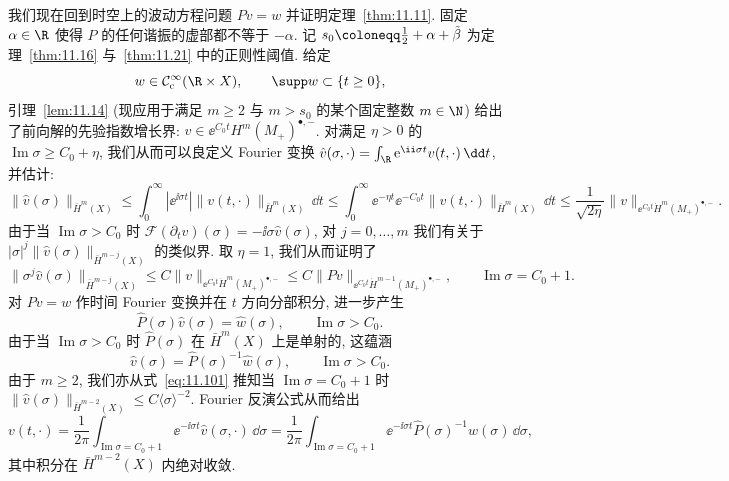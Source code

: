 我们现在回到时空上的波动方程问题 $P v = w$ 并证明定理~\ref{thm:11.11}. 固定 $\alpha \in \R$ 使得 $P$ 的任何谐振的虚部都不等于 $-\alpha$. 记 $s_0 \defeq \frac{1}{2} + \alpha + \tilde\beta$ 为定理~\ref{thm:11.16} 与~\ref{thm:11.21} 中的正则性阈值. 给定
\begin{equation}\label{eq:11.99}
    w \in \mathcal{C}_{\mathrm{c}}^\infty(\R \times X), \qquad \supp w \subset \{t \ge 0\},
\end{equation}
引理~\ref{lem:11.14} (现应用于满足 $m \ge 2$ 与 $m > s_0$ 的某个固定整数 $m \in \N$) 给出了前向解的先验指数增长界: $v \in \ee^{C_0 t} H^m(M_+)^{\bullet, -}$. 对满足 $\eta > 0$ 的 $\operatorname{Im}\sigma \ge C_0 + \eta$, 我们从而可以良定义 Fourier 变换 $\hat v(\sigma, \cdot) = \int_\R \ee^{\ii \sigma t} v(t, \cdot) \,\dd t$, 并估计:
\begin{equation}\label{eq:11.100}
    \|\hat v(\sigma)\|_{\bar H^m(X)} \le \int_0^\infty |\ee^{\ii \sigma t}| \|v(t, \cdot)\|_{\bar H^m(X)} \,\dd t \le \int_0^\infty \ee^{-\eta t} \ee^{-C_0 t} \|v(t, \cdot)\|_{\bar H^m(X)} \,\dd t \le \frac{1}{\sqrt{2\eta}} \|v\|_{\ee^{C_0 t} \dot H^m(M_+)^{\bullet, -}}.
\end{equation}
由于当 $\operatorname{Im}\sigma > C_0$ 时 $\mathcal{F}(\partial_t v)(\sigma) = -\ii \sigma \hat v(\sigma)$, 对 $j = 0, \ldots, m$ 我们有关于 $|\sigma|^j \|\hat v(\sigma)\|_{\bar H^{m-j}(X)}$ 的类似界. 取 $\eta = 1$, 我们从而证明了
\begin{equation}\label{eq:11.101}
    \|\sigma^j \hat v(\sigma)\|_{\bar H^{m-j}(X)} \le C \|v\|_{\ee^{C_0 t} \dot H^m(M_+)^{\bullet, -}} \le C \|Pv\|_{\ee^{C_0 t} \dot H^{m-1}(M_+)^{\bullet, -}}, \qquad \operatorname{Im}\sigma = C_0 + 1.
\end{equation}
对 $P v = w$ 作时间 Fourier 变换并在 $t$ 方向分部积分, 进一步产生
\begin{equation}\label{eq:11.102}
    \widehat{P}(\sigma) \hat v(\sigma) = \hat w(\sigma), \qquad \operatorname{Im}\sigma > C_0.
\end{equation}
由于当 $\operatorname{Im}\sigma > C_0$ 时 $\widehat{P}(\sigma)$ 在 $\bar H^m(X)$ 上是单射的, 这蕴涵
\begin{equation}\label{eq:11.103}
    \hat v(\sigma) = \widehat{P}(\sigma)^{-1} \hat w(\sigma), \qquad \operatorname{Im}\sigma > C_0.
\end{equation}
由于 $m \ge 2$, 我们亦从式~\eqref{eq:11.101} 推知当 $\operatorname{Im}\sigma = C_0 + 1$ 时 $\|\hat v(\sigma)\|_{\bar H^{m-2}(X)} \le C \langle\sigma\rangle^{-2}$. Fourier 反演公式从而给出
\begin{equation}\label{eq:11.104}
    v(t, \cdot) = \frac{1}{2\pi} \int_{\operatorname{Im}\sigma = C_0 + 1} \ee^{-\ii \sigma t} \hat v(\sigma, \cdot) \,\dd \sigma = \frac{1}{2\pi} \int_{\operatorname{Im}\sigma = C_0 + 1} \ee^{-\ii \sigma t} \widehat{P}(\sigma)^{-1} \hat w(\sigma) \,\dd \sigma,
\end{equation}
其中积分在 $\bar H^{m-2}(X)$ 内绝对收敛.

